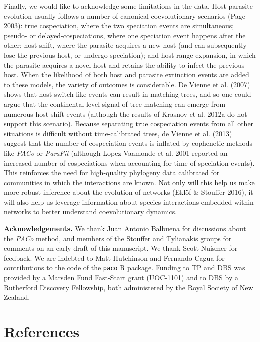 \documentclass[11pt,serif]{article}
\begin{document}
Finally, we would like to acknowledge some limitations in the data.
Host-parasite evolution usually follows a number of canonical
coevolutionary scenarios (Page 2003): true cospeciation, where the two
speciation events are simultaneous; pseudo- or delayed-cospeciations,
where one speciation event happens after the other; host shift, where
the parasite acquires a new host (and can subsequently lose the previous
host, or undergo speciation); and host-range expansion, in which the
parasite acquires a novel host and retains the ability to infect the
previous host. When the likelihood of both host and parasite extinction
events are added to these models, the variety of outcomes is
considerable. De Vienne et al. (2007) shows that host-switch-like events
can result in matching trees, and so one could argue that the
continental-level signal of tree matching can emerge from numerous
host-shift events (although the results of Krasnov et al. 2012a do not
support this scenario). Because separating true cospeciation events from
all other situations is difficult without time-calibrated trees, de
Vienne et al. (2013) suggest that the number of cospeciation events is
inflated by cophenetic methods like \emph{PACo} or \emph{ParaFit}
(although Lopez-Vaamonde et al. 2001 reported an increased number of
cospeciations when accounting for time of speciation events). This
reinforces the need for high-quality phylogeny data calibrated for
communities in which the interactions are known. Not only will this help
us make more robust inference about the evolution of networks (Eklöf \&
Stouffer 2016), it will also help us leverage information about species
interactions embedded within networks to better understand
coevolutionary dynamics.

\textbf{Acknowledgements.} We thank Juan Antonio Balbuena for
discussions about the \emph{PACo} method, and members of the Stouffer
and Tylianakis groups for comments on an early draft of this manuscript.
We thank Scott Nuismer for feedback. We are indebted to Matt Hutchinson
and Fernando Cagua for contributions to the code of the \lstinline!paco!
R package. Funding to TP and DBS was provided by a Marsden Fund
Fast-Start grant (UOC-1101) and to DBS by a Rutherford Discovery
Fellowship, both administered by the Royal Society of New Zealand.

\section*{References}\label{references}
\end{document}
